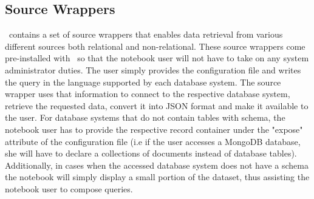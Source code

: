 \subsection{Source Wrappers}
\label{subsection:source-wrappers}


\projname\ contains a set of source wrappers that enables data retrieval from various different sources both relational and non-relational. These source wrappers come pre-installed with \projname\ so that the notebook user will not have to take on any system administrator duties. The user simply provides the configuration file and writes the query in the language supported by each database system. The source wrapper uses that information to connect to the respective database system, retrieve the requested data, convert it into JSON format and make it available to the user. For database systems that do not contain tables with schema, the notebook user has to provide the respective record container under the "expose" attribute of the configuration file (i.e if the user accesses a MongoDB database, she will have to declare a collections of documents instead of database tables). Additionally, in cases when the accessed database system does not have a schema the notebook will simply display a small portion of the dataset, thus assisting the notebook user to compose queries.





